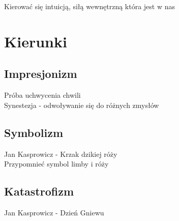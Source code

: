 \documentclass[a4paper]{article}
\begin{document}
Kierować się intuicją, siłą wewnętrzną która jest w nas
\section{Kierunki}
\subsection{Impresjonizm}
Próba uchwycenia chwili \\
Synestezja - odwoływanie się do różnych zmysłów
\subsection{Symbolizm}
Jan Kasprowicz - Krzak dzikiej róży \\
Przypomnieć symbol limby i róży
\subsection{Katastrofizm}
Jan Kasprowicz - Dzień Gniewu
\end{document}
